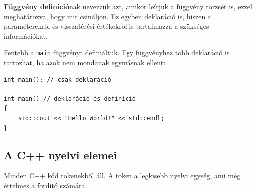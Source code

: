 \documentclass[a4paper,11.5pt,table]{article}
\begin{document}
	\medskip
	\textbf{Függvény definíció}nak nevezzük azt, amikor leírjuk a függvény törzsét is, ezzel meghatározva, hogy mit csináljon. Ez egyben deklaráció is, hiszen a paraméterekről és visszatérési értékekről is tartalmazza a szükséges információkat.
	
	\medskip
	Fentebb a \texttt{main} függvényt definiáltuk. Egy függvényhez több deklaráció is tartozhat, ha azok nem mondanak egymásnak ellent:
	\begin{lstlisting}
int main(); // csak deklaráció	

int main() // deklaráció és definíció
{
	std::cout << "Hello World!" << std::endl;
}
	\end{lstlisting}
	\subsection{A C++ nyelvi elemei}
	Minden C++ kód tokenekből áll. A token a legkisebb nyelvi egység, ami még értelmes a fordító számára. %
	
\end{document}
